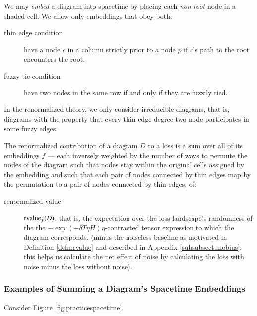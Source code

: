 \documentclass{article}
\theoremstyle{plain}
\theoremstyle{definition}
\newcommand{\rvalue}{\text{\textnormal{rvalue}}}
\begin{document}
            We may \emph{embed} a diagram into spacetime by placing each
            \emph{non-root} node in a shaded cell.  We allow only embeddings
            that obey both:
            \begin{description}
                \item[thin edge condition] have a node $c$ in a column strictly
                    prior to a node $p$ if $c$'s path to the root encounters
                    the root.
                \item[fuzzy tie condition] have two nodes in the same row if
                    and only if they are fuzzily tied.
            \end{description}

            In the renormalized theory, we only consider irreducible diagrams,
            that is, diagrams with the property that every thin-edge-degree two
            node participates in some fuzzy edges.

            The renormalized contribution of a diagram $D$ to a loss is a sum
            over all of its embeddings $f$ --- each inversely weighted by the
            number of ways to permute the nodes of the diagram such that nodes
            stay within the original cells assigned by the embedding and such
            that each pair of nodes connected by thin edges map by the
            permutation to a pair of nodes connected by thin edges, of:
            \begin{description}
                \item[renormalized value] $\rvalue_f(D)$, that is, the
                    expectation over the loss landscape's randomness of the the
                    $-\exp(-\delta T \eta H)\eta$-contracted tensor expression
                    to which the diagram corresponds.  (minus the noiseless
                    baseline as motivated in Definition \ref{defn:rvalue} and
                    described in Appendix \ref{subsubsect:mobius}; this helps
                    us calculate the net effect of noise by calculating the
                    loss with noise minus the loss without noise). 
            \end{description}

        \subsubsection*{Examples of Summing a Diagram's Spacetime Embeddings}
            Consider Figure \ref{fig:practicespacetime}.
\end{document}
